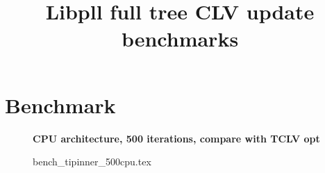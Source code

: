 \documentclass[a4paper]{article}
\begin{document}
\newcommand*{\figuretitle}[1]{%
    {\centering%
    \textbf{#1}%
    \par\medskip}%
}


\title{Libpll full tree CLV update benchmarks}
\maketitle



\section{Benchmark}


\begin{figure}[!htb]
\figuretitle{CPU architecture, 500 iterations, compare with TCLV opt}
{bench_tipinner_500cpu.tex}
\end{figure}


\end{document}
